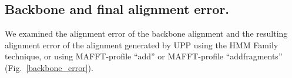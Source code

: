 

\clearpage 
\subsection{Backbone and final alignment error.}\label{backbone_alignment_error}
We examined the alignment error of the backbone alignment and the resulting alignment error 
of the alignment generated by UPP using the HMM Family technique, or using
MAFFT-profile ``add'' or MAFFT-profile ``addfragments'' (Fig.~\ref{backbone_error}).


